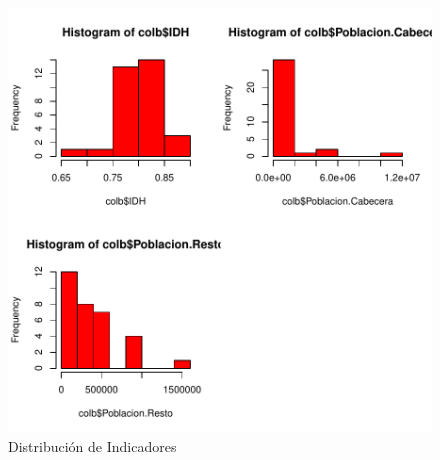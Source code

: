 \documentclass{article}
\begin{document}
\begin{figure}[h]
\centering
\includegraphics{ProyectoFinal2-hist}
\caption{Distribución de Indicadores}
\label{hist}
\end{figure}



\renewcommand{\refname}{Bibliografia}

\end{document}
